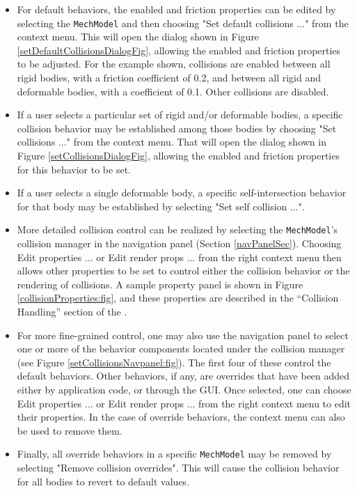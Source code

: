 \documentclass{article}
\begin{document}
\begin{itemize}

\item For default behaviors, the {\sf enabled} and {\sf friction}
properties can be edited by selecting the {\tt MechModel} and then
choosing {\sf "Set default collisions ..."} from the context
menu. This will open the dialog shown in Figure
\ref{setDefaultCollisionsDialogFig}, allowing the {\sf enabled}
and {\sf friction} properties to
be adjusted. For the example shown, collisions are enabled between all
rigid bodies, with a friction coefficient of 0.2, and between all
rigid and deformable bodies, with a coefficient of 0.1. Other
collisions are disabled.

\item If a user selects a particular set of rigid and/or deformable
bodies, a specific collision behavior may be established among those
bodies by choosing {\sf "Set collisions ..."} from the context menu.
That will open the dialog shown in Figure
\ref{setCollisionsDialogFig}, allowing the {\sf enabled} and {\sf
friction} properties for this behavior to be set.

\item If a user selects a single deformable body, a specific
self-intersection behavior for that body may be established by selecting
{\sf "Set self collision ..."}.

\item More detailed collision control can be realized by selecting the
{\tt MechModel}'s collision manager in the navigation panel (Section
\ref{navPanelSec}). Choosing {\sf Edit properties ...} or {\sf Edit
render props ...}  from the right context menu then allows other
properties to be set to control either the collision behavior or the
rendering of collisions. A sample property panel is shown in Figure
\ref{collisionProperties:fig}, and these properties are described in
the ``Collision Handling'' section of the
.

\item For more fine-grained control, one may also use the navigation
panel to select one or more of the behavior components located under
the collision manager (see Figure
\ref{setCollisionsNavpanel:fig}). The first four of these control the
default behaviors. Other behaviors, if any, are overrides that have
been added either by application code, or through the GUI.  Once
selected, one can choose {\sf Edit properties ...} or {\sf Edit render
props ...}  from the right context menu to edit their properties.  In
the case of override behaviors, the context menu can also be used to
remove them.

\item Finally, all override behaviors in a specific {\tt MechModel}
may be removed by selecting {\sf "Remove collision overrides"}. This
will cause the collision behavior for all bodies to revert to default
values.

\end{itemize}
\end{document}
